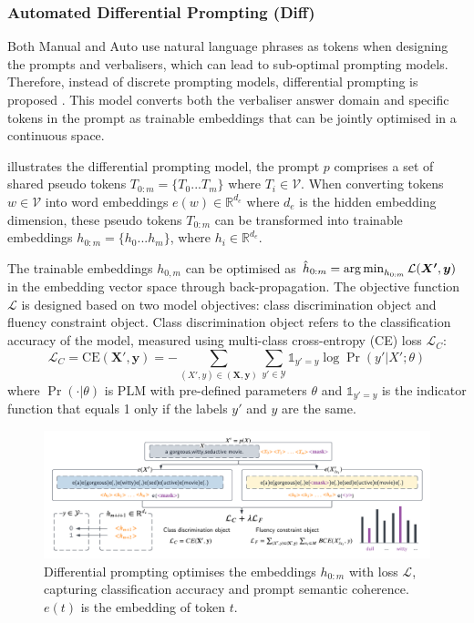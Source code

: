 \vspace{-0.5em}
\subsubsection{Automated Differential Prompting (Diff)}
Both Manual and Auto use natural language phrases as tokens when designing the prompts and verbalisers, which can lead to sub-optimal prompting models. Therefore, instead of discrete prompting models, differential prompting is proposed \cite{zhang2021differentiable}. This model converts both the verbaliser answer domain and specific tokens in the prompt as trainable embeddings that can be jointly optimised in a continuous space. 

 illustrates the differential prompting model, the prompt $p$ comprises a set of shared pseudo tokens $T_{0:m} = \{T_0...T_m\}$ where $T_i \in \mathcal{V}$. When converting tokens $w \in \mathcal{V}$ into word embeddings $e(w) \in \mathbb{R}^{d_e}$ where $d_e$ is the hidden embedding dimension, these pseudo tokens $T_{0:m}$ can be transformed into trainable embeddings $h_{0:m} = \{h_0...h_m\}$, where $h_i \in \mathbb{R}^{d_e}$. 

The trainable embeddings $h_{0,m}$ can be optimised as $\hat{h}_{0:m} = \operatorname*{arg\,min}_{h_{0:m}} \mathcal{L}(\boldsymbol{X'}, \boldsymbol{y})$ in the embedding vector space through back-propagation. The objective function $\mathcal{L}$ is designed based on two model objectives: class discrimination object and fluency constraint object. Class discrimination object refers to the classification accuracy of the model, measured using multi-class cross-entropy (CE) loss $\mathcal{L}_C$:
\begin{equation}
    \label{equation:class_disc}
    \mathcal{L}_C = \text{CE}(\boldsymbol{X}
', \boldsymbol{y}) = - \sum_{(X', y) \in (\boldsymbol{X}, \boldsymbol{y})}\sum_{y' \in \mathcal{Y}} \mathds{1}_{y' = y} \log \Pr(y'|X'; \theta)
\end{equation}
where $\Pr(\cdot|\theta)$ is PLM with pre-defined parameters $\theta$ and $\mathds{1}_{y'=y}$ is the indicator function that equals 1 only if the labels $y'$ and $y$ are the same.

\vspace{-0.5em}
\begin{figure}[!ht]
    \centering
    \includegraphics[width=\hsize]{figures/preparation_media/prepare-diff.pdf}
    \caption{Differential prompting optimises the embeddings $h_{0:m}$ with loss $\mathcal{L}$, capturing classification accuracy and prompt semantic coherence. $e(t)$ is the embedding of token $t$.}
    \label{fig:prepare-diff}
\end{figure}

